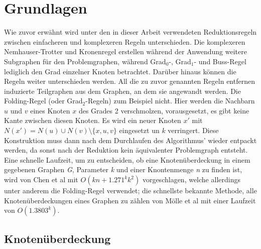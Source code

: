 
\chapter{Grundlagen}
\label{ch:Grundlagen}
Wie zuvor erwähnt wird unter den in dieser Arbeit verwendeten Reduktionsregeln zwischen einfacheren und komplexeren Regeln unterschieden. Die komplexeren Nemhauser-Trotter und Kronenregel erstellen während der Anwendung weitere Subgraphen für den Problemgraphen, während Grad$_{0}$-, Grad$_{1}$- und Buss-Regel lediglich den Grad einzelner Knoten betrachtet. Darüber hinaus können die Regeln weiter unterschieden werden. All die zu zuvor genannten Regeln entfernen induzierte Teilgraphen aus dem Graphen, an dem sie angewandt werden. Die Folding-Regel \cite{paper:4} (oder Grad$_{2}$-Regeln) zum Beispiel nicht. Hier werden die Nachbarn $u$ und $v$ eines Knoten $x$ des Grades 2 verschmolzen, vorausgesetzt, es gibt keine Kante zwischen diesen Knoten. Es wird ein neuer Knoten $x'$ mit $N(x') = N(u) \cup N(v) \setminus \{x,u,v\}$ eingesetzt un $k$ verringert. Diese Konstruktion muss dann nach dem Durchlaufen des Algorithmus' wieder entpackt werden, da sonst nach der Reduktion kein äquivalenter Problemgraph entsteht. 
Eine schnelle Laufzeit, um zu entscheiden, ob eine Knotenüberdeckung in einem gegebenen Graphen \emph{G}, Parameter \emph{k} und einer Knontenmenge \emph{n} zu finden ist, wird von Chen et al \cite{paper:4} mit $O(kn + 1.271^{k}k^{2})$ vorgeschlagen, welche allerdings unter anderem die Folding-Regel verwendet; die schnellste bekannte Methode, alle Knotenüberdeckungen eines Graphen zu zählen von Mölle et al \cite{paper:5} mit einer Laufzeit von $O(1.3803^{k})$.

\section{Knotenüberdeckung}
\label{ch:Grundlagen:sec:Knotenüberdeckung}
